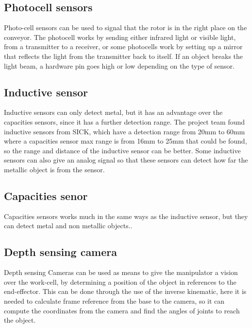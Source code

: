  
  \subsection{Photocell sensors} 
  Photo-cell sensors can be used to signal that the rotor is in the right place on the conveyor. The photocell works by sending either infrared light or visible light, from a transmitter to a receiver, or some photocells work by setting up a mirror that reflects the light from the transmitter back to itself. If an object breaks the light beam, a hardware pin goes high or low depending on the type of sensor\cite{SICKfo}. \\

 \subsection{Inductive sensor}
 Inductive sensors can only detect metal, but it has an advantage over the capacities sensors, since it has a further detection range. The project team found inductive sensors from SICK, which have a detection range from 20mm to 60mm \cite{SICKin} where a capacities sensor max range is from 16mm to 25mm \cite{SICKka} that could be found, so the range and distance of the inductive sensor can be better. Some inductive sensors can also give an analog signal so that these sensors can detect how far the metallic object is from the sensor\cite{SICKin}.\\ 

 \subsection{Capacities senor} 
 Capacities sensors works much in the same ways as the inductive sensor, but they can detect metal and non metallic objects.\cite{SICKka}.\\

 \subsection{Depth sensing camera} \label{depthcam}
 Depth sensing Cameras can be used as means to give the manipulator a vision over the work-cell, by determining a position of the object in references to the end-effector\cite{cam}. This can be done through the use of the inverse kinematic, here it is needed to calculate frame reference from the base to the camera, so it can compute the coordinates from the camera and find the angles of joints to reach the object\cite{JohnC}.\\
 
